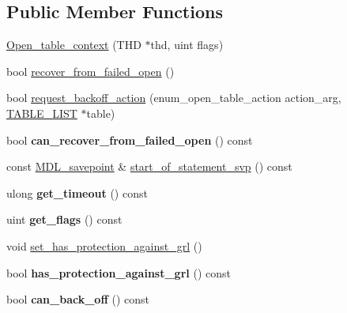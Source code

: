 \subsection*{Public Member Functions}
\begin{DoxyCompactItemize}
\item 
\mbox{\hyperlink{group__Data__Dictionary_ga8eaa3b1fdce29eac72028f96c55607d3}{Open\+\_\+table\+\_\+context}} (T\+HD $\ast$thd, uint flags)
\item 
bool \mbox{\hyperlink{group__Data__Dictionary_gade48892bc4607303f7f4d3d6df4c39de}{recover\+\_\+from\+\_\+failed\+\_\+open}} ()
\item 
bool \mbox{\hyperlink{group__Data__Dictionary_gaf35889f70c8719510fb76899cf9cf20b}{request\+\_\+backoff\+\_\+action}} (enum\+\_\+open\+\_\+table\+\_\+action action\+\_\+arg, \mbox{\hyperlink{structTABLE__LIST}{T\+A\+B\+L\+E\+\_\+\+L\+I\+ST}} $\ast$table)
\item 
\mbox{\label{classOpen__table__context_aee1f9f63f32c46b08ea6d94d90c57cfd}} 
bool {\bfseries can\+\_\+recover\+\_\+from\+\_\+failed\+\_\+open} () const
\item 
const \mbox{\hyperlink{classMDL__savepoint}{M\+D\+L\+\_\+savepoint}} \& \mbox{\hyperlink{classOpen__table__context_afad4536802b51dd231dd4a4e91309abb}{start\+\_\+of\+\_\+statement\+\_\+svp}} () const
\item 
\mbox{\label{classOpen__table__context_a5b28ae0b9c622cd645419e618ef00b6f}} 
ulong {\bfseries get\+\_\+timeout} () const
\item 
\mbox{\label{classOpen__table__context_a5dd83bd54b064eb0934a9183e634c1d4}} 
uint {\bfseries get\+\_\+flags} () const
\item 
void \mbox{\hyperlink{classOpen__table__context_a50d842b440bbda463e5780b67fd7897a}{set\+\_\+has\+\_\+protection\+\_\+against\+\_\+grl}} ()
\item 
\mbox{\label{classOpen__table__context_a6bd3420ec54cb226d7ed8f2bd51ce3ef}} 
bool {\bfseries has\+\_\+protection\+\_\+against\+\_\+grl} () const
\item 
\mbox{\label{classOpen__table__context_adfeb937fab8d48aaa3e941cbab052adf}} 
bool {\bfseries can\+\_\+back\+\_\+off} () const
\end{DoxyCompactItemize}


